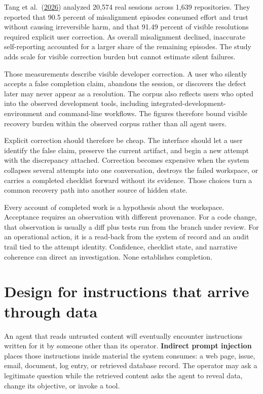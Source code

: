 Tang et al.~(\href{https://arxiv.org/abs/2605.29442}{2026}) analyzed 20,574 real sessions across 1,639 repositories. They reported that 90.5 percent of misalignment episodes consumed effort and trust without causing irreversible harm, and that 91.49 percent of visible resolutions required explicit user correction. As overall misalignment declined, inaccurate self-reporting accounted for a larger share of the remaining episodes. The study adds scale for visible correction burden but cannot estimate silent failures.

Those measurements describe visible developer correction. A user who silently accepts a false completion claim, abandons the session, or discovers the defect later may never appear as a resolution. The corpus also reflects users who opted into the observed development tools, including integrated-development-environment and command-line workflows. The figures therefore bound visible recovery burden within the observed corpus rather than all agent users.

Explicit correction should therefore be cheap. The interface should let a user identify the false claim, preserve the current artifact, and begin a new attempt with the discrepancy attached. Correction becomes expensive when the system collapses several attempts into one conversation, destroys the failed workspace, or carries a completed checklist forward without its evidence. Those choices turn a common recovery path into another source of hidden state.

Every account of completed work is a hypothesis about the workspace. Acceptance requires an observation with different provenance. For a code change, that observation is usually a diff plus tests run from the branch under review. For an operational action, it is a read-back from the system of record and an audit trail tied to the attempt identity. Confidence, checklist state, and narrative coherence can direct an investigation. None establishes completion.

\hypertarget{design-for-instructions-that-arrive-through-data}{%
\section{Design for instructions that arrive through data}\label{design-for-instructions-that-arrive-through-data}}

An agent that reads untrusted content will eventually encounter instructions written for it by someone other than its operator. \textbf{Indirect prompt injection} places those instructions inside material the system consumes: a web page, issue, email, document, log entry, or retrieved database record. The operator may ask a legitimate question while the retrieved content asks the agent to reveal data, change its objective, or invoke a tool.

